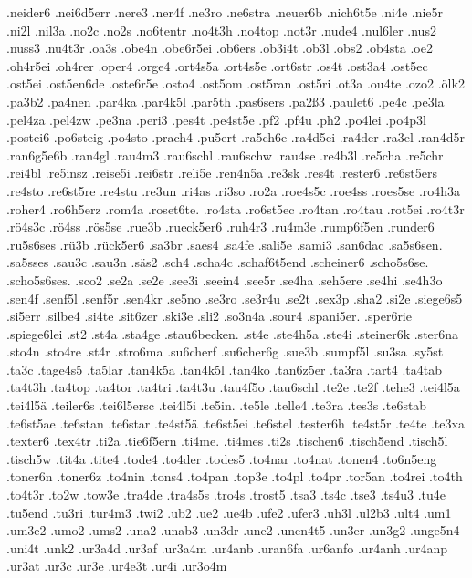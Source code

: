 {.neider6
.nei6d5err
.nere3
.ner4f
.ne3ro
.ne6stra
.neuer6b
.nich6t5e
.ni4e
.nie5r
.ni2l
.nil3a
.no2c
.no2s
.no6tentr
.no4t3h
.no4top
.not3r
.nude4
.nul6ler
.nus2
.nuss3
.nu4t3r
.oa3s
.obe4n
.obe6r5ei
.ob6ers
.ob3i4t
.ob3l
.obs2
.ob4sta
.oe2
.oh4r5ei
.oh4rer
.oper4
.orge4
.ort4s5a
.ort4s5e
.ort6str
.os4t
.ost3a4
.ost5ec
.ost5ei
.ost5en6de
.oste6r5e
.osto4
.ost5om
.ost5ran
.ost5ri
.ot3a
.ou4te
.ozo2
.ölk2
.pa3b2
.pa4nen
.par4ka
.par4k5l
.par5th
.pas6sers
.pa2ß3
.paulet6
.pe4c
.pe3la
.pel4za
.pel4zw
.pe3na
.peri3
.pes4t
.pe4st5e
.pf2
.pf4u
.ph2
.po4lei
.po4p3l
.postei6
.po6steig
.po4sto
.prach4
.pu5ert
.ra5ch6e
.ra4d5ei
.ra4der
.ra3el
.ran4d5r
.ran6g5e6b
.ran4gl
.rau4m3
.rau6schl
.rau6schw
.rau4se
.re4b3l
.re5cha
.re5chr
.rei4bl
.re5insz
.reise5i
.rei6str
.reli5e
.ren4n5a
.re3sk
.res4t
.rester6
.re6st5ers
.re4sto
.re6st5re
.re4stu
.re3un
.ri4as
.ri3so
.ro2a
.roe4s5c
.roe4ss
.roes5se
.ro4h3a
.roher4
.ro6h5erz
.rom4a
.roset6te.
.ro4sta
.ro6st5ec
.ro4tan
.ro4tau
.rot5ei
.ro4t3r
.rö4s3c
.rö4ss
.rös5se
.rue3b
.rueck5er6
.ruh4r3
.ru4m3e
.rump6f5en
.runder6
.ru5s6ses
.rü3b
.rück5er6
.sa3br
.saes4
.sa4fe
.sali5e
.sami3
.san6dac
.sa5s6sen.
.sa5sses
.sau3c
.sau3n
.säs2
.sch4
.scha4c
.schaf6t5end
.scheiner6
.scho5s6se.
.scho5s6ses.
.sco2
.se2a
.se2e
.see3i
.seein4
.see5r
.se4ha
.seh5ere
.se4hi
.se4h3o
.sen4f
.senf5l
.senf5r
.sen4kr
.se5no
.se3ro
.se3r4u
.se2t
.sex3p
.sha2
.si2e
.siege6s5
.si5err
.silbe4
.si4te
.sit6zer
.ski3e
.sli2
.so3n4a
.sour4
.spani5er.
.sper6rie
.spiege6lei
.st2
.st4a
.sta4ge
.stau6becken.
.st4e
.ste4h5a
.ste4i
.steiner6k
.ster6na
.sto4n
.sto4re
.st4r
.stro6ma
.su6cherf
.su6cher6g
.sue3b
.sumpf5l
.su3sa
.sy5st
.ta3c
.tage4s5
.ta5lar
.tan4k5a
.tan4k5l
.tan4ko
.tan6z5er
.ta3ra
.tart4
.ta4tab
.ta4t3h
.ta4top
.ta4tor
.ta4tri
.ta4t3u
.tau4f5o
.tau6schl
.te2e
.te2f
.tehe3
.tei4l5a
.tei4l5ä
.teiler6s
.tei6l5ersc
.tei4l5i
.te5in.
.te5le
.telle4
.te3ra
.tes3s
.te6stab
.te6st5ae
.te6stan
.te6star
.te4st5ä
.te6st5ei
.te6stel
.tester6h
.te4st5r
.te4te
.te3xa
.texter6
.tex4tr
.ti2a
.tie6f5ern
.ti4me.
.ti4mes
.ti2s
.tischen6
.tisch5end
.tisch5l
.tisch5w
.tit4a
.tite4
.tode4
.to4der
.todes5
.to4nar
.to4nat
.tonen4
.to6n5eng
.toner6n
.toner6z
.to4nin
.tons4
.to4pan
.top3e
.to4pl
.to4pr
.tor5an
.to4rei
.to4th
.to4t3r
.to2w
.tow3e
.tra4de
.tra4s5s
.tro4s
.trost5
.tsa3
.ts4c
.tse3
.ts4u3
.tu4e
.tu5end
.tu3ri
.tur4m3
.twi2
.ub2
.ue2
.ue4b
.ufe2
.ufer3
.uh3l
.ul2b3
.ult4
.um1
.um3e2
.umo2
.ums2
.una2
.unab3
.un3dr
.une2
.unen4t5
.un3er
.un3g2
.unge5n4
.uni4t
.unk2
.ur3a4d
.ur3af
.ur3a4m
.ur4anb
.uran6fa
.ur6anfo
.ur4anh
.ur4anp
.ur3at
.ur3c
.ur3e
.ur4e3t
.ur4i
.ur3o4m
}
